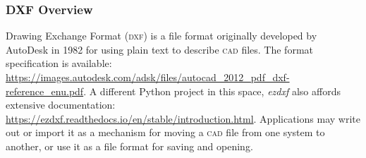 \documentclass{ltxdoc}
\begin{document}

\subsubsection{DXF Overview}

Drawing Exchange Format (\textsc{dxf}) is a file format originally developed by AutoDesk in 1982 for using plain text to describe \textsc{cad} files. The format specification is available: \url{https://images.autodesk.com/adsk/files/autocad_2012_pdf_dxf-reference_enu.pdf}. A different Python project in this space, \emph{ezdxf} also affords extensive documentation: \url{https://ezdxf.readthedocs.io/en/stable/introduction.html}. Applications may write out or import it as a mechanism for moving a \textsc{cad} file from one system to another, or use it as a file format for saving and opening.
\end{document}
